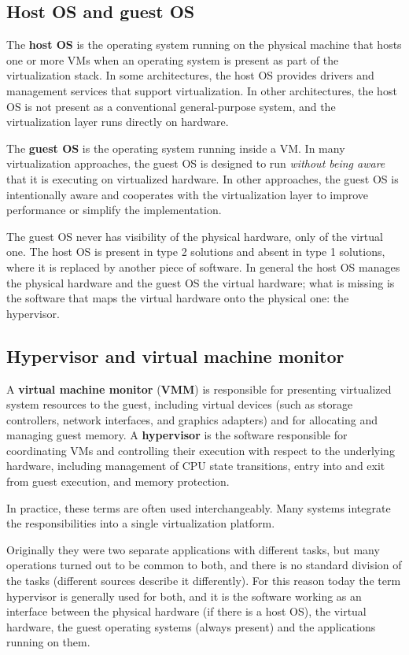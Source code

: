 \subsection{Host OS and guest OS}

The \textbf{host OS} is the operating system running on the physical machine that hosts one or more VMs when an operating system is present as part of the virtualization stack. In some architectures, the host OS provides drivers and management services that support virtualization. In other architectures, the host OS is not present as a conventional general-purpose system, and the virtualization layer runs directly on hardware.

The \textbf{guest OS} is the operating system running inside a VM. In many virtualization approaches, the guest OS is designed to run \emph{without being aware} that it is executing on virtualized hardware. In other approaches, the guest OS is intentionally aware and cooperates with the virtualization layer to improve performance or simplify the implementation.

The guest OS never has visibility of the physical hardware, only of the virtual one. The host OS is present in type 2 solutions and absent in type 1 solutions, where it is replaced by another piece of software. In general the host OS manages the physical hardware and the guest OS the virtual hardware; what is missing is the software that maps the virtual hardware onto the physical one: the hypervisor.

\subsection{Hypervisor and virtual machine monitor}

A \textbf{virtual machine monitor} (\textbf{VMM}) is responsible for presenting virtualized system resources to the guest, including virtual devices (such as storage controllers, network interfaces, and graphics adapters) and for allocating and managing guest memory. A \textbf{hypervisor} is the software responsible for coordinating VMs and controlling their execution with respect to the underlying hardware, including management of CPU state transitions, entry into and exit from guest execution, and memory protection.

In practice, these terms are often used interchangeably. Many systems integrate the responsibilities into a single virtualization platform.

Originally they were two separate applications with different tasks, but many operations turned out to be common to both, and there is no standard division of the tasks (different sources describe it differently). For this reason today the term hypervisor is generally used for both, and it is the software working as an interface between the physical hardware (if there is a host OS), the virtual hardware, the guest operating systems (always present) and the applications running on them.

